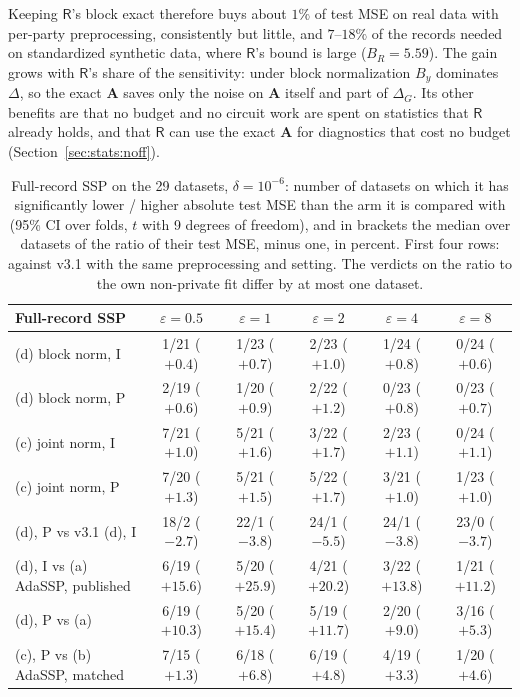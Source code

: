 \documentclass[11pt]{article}
\theoremstyle{definition}
\theoremstyle{plain}
\newcommand{\bA}{\mathbf{A}}
\newcommand{\Party}[1]{\textsf{#1}}
\newcommand{\Rp}{\Party{R}}
\begin{document}
Keeping $\Rp$'s block exact therefore buys about $1\%$ of test MSE on real data with per-party preprocessing, consistently but little, and $7$--$18\%$ of the records needed on standardized synthetic data, where $\Rp$'s bound is large ($B_R = 5.59$). The gain grows with $\Rp$'s share of the sensitivity: under block normalization $B_y$ dominates $\Delta$, so the exact $\bA$ saves only the noise on $\bA$ itself and part of $\Delta_G$. Its other benefits are that no budget and no circuit work are spent on statistics that $\Rp$ already holds, and that $\Rp$ can use the exact $\bA$ for diagnostics that cost no budget (Section~\ref{sec:stats:noff}).

\begin{table}[t]
  \centering
  \small
  \caption{Full-record SSP on the 29 datasets, $\delta = 10^{-6}$: number of datasets on which it has significantly lower / higher absolute test MSE than the arm it is compared with (95\% CI over folds, $t$ with 9 degrees of freedom), and in brackets the median over datasets of the ratio of their test MSE, minus one, in percent. First four rows: against v3.1 with the same preprocessing and setting. The verdicts on the ratio to the own non-private fit differ by at most one dataset.}
  \label{tab:full_verdicts}
  \footnotesize
  \setlength{\tabcolsep}{3.5pt}
  \begin{tabular}{@{}lccccc@{}}
    \toprule
    Full-record SSP & $\varepsilon = 0.5$ & $\varepsilon = 1$ & $\varepsilon = 2$ & $\varepsilon = 4$ & $\varepsilon = 8$ \\
    \midrule
    (d) block norm, I & 1/21 ($+0.4$) & 1/23 ($+0.7$) & 2/23 ($+1.0$) & 1/24 ($+0.8$) & 0/24 ($+0.6$) \\
    (d) block norm, P & 2/19 ($+0.6$) & 1/20 ($+0.9$) & 2/22 ($+1.2$) & 0/23 ($+0.8$) & 0/23 ($+0.7$) \\
    (c) joint norm, I & 7/21 ($+1.0$) & 5/21 ($+1.6$) & 3/22 ($+1.7$) & 2/23 ($+1.1$) & 0/24 ($+1.1$) \\
    (c) joint norm, P & 7/20 ($+1.3$) & 5/21 ($+1.5$) & 5/22 ($+1.7$) & 3/21 ($+1.0$) & 1/23 ($+1.0$) \\
    (d), P vs v3.1 (d), I & 18/2 ($-2.7$) & 22/1 ($-3.8$) & 24/1 ($-5.5$) & 24/1 ($-3.8$) & 23/0 ($-3.7$) \\
    (d), I vs (a) AdaSSP, published & 6/19 ($+15.6$) & 5/20 ($+25.9$) & 4/21 ($+20.2$) & 3/22 ($+13.8$) & 1/21 ($+11.2$) \\
    (d), P vs (a) & 6/19 ($+10.3$) & 5/20 ($+15.4$) & 5/19 ($+11.7$) & 2/20 ($+9.0$) & 3/16 ($+5.3$) \\
    (c), P vs (b) AdaSSP, matched & 7/15 ($+1.3$) & 6/18 ($+6.8$) & 6/19 ($+4.8$) & 4/19 ($+3.3$) & 1/20 ($+4.6$) \\
    \bottomrule
  \end{tabular}
\end{table}
\end{document}
